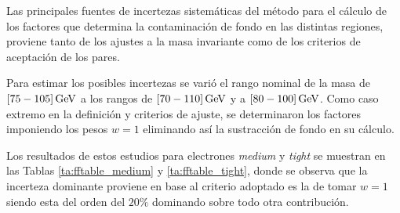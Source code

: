 Las principales fuentes de incertezas sistemáticas del método para el cálculo de los factores que determina la contaminación de fondo en las distintas regiones, proviene tanto de los ajustes a la masa invariante como de los criterios de aceptación de los pares.  

Para estimar los posibles incertezas se varió el rango nominal de la masa de $[75-105]\, \mathrm{GeV}$ a los rangos de $[70-110]\, \mathrm{GeV}$ y a $[80-100]\, \mathrm{GeV}$. Como caso extremo en la definición y criterios de ajuste, se determinaron los factores imponiendo los pesos $w=1$ eliminando así la sustracción de fondo en su cálculo. 

Los resultados de estos estudios para electrones \textit{medium} y \textit{tight} se muestran en las Tablas \ref{ta:fftable_medium} y \ref{ta:fftable_tight}, donde se observa que la incerteza dominante proviene en base al criterio adoptado es la de tomar $w=1$ siendo esta del orden del $20 \%$ dominando sobre todo otra contribución.













